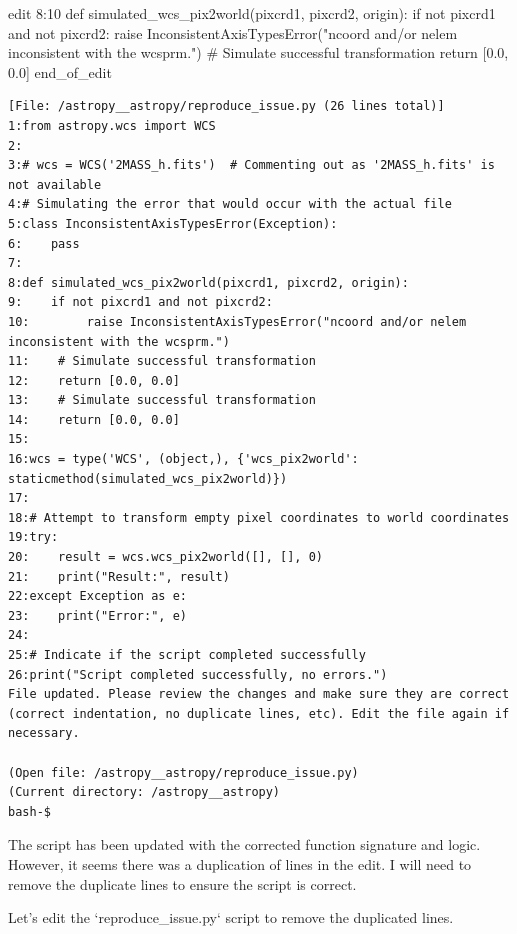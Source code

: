 {\begin{agentbox}
\hrulefill
\begin{CodeVerbatim}[breaklines=true, breakanywhere=true]
edit 8:10
def simulated_wcs_pix2world(pixcrd1, pixcrd2, origin):
    if not pixcrd1 and not pixcrd2:
        raise InconsistentAxisTypesError("ncoord and/or nelem inconsistent with the wcsprm.")
    # Simulate successful transformation
    return [0.0, 0.0]
end_of_edit
\end{CodeVerbatim}
\end{agentbox}
\begin{observationbox}\begin{Verbatim}[breaklines=true, breakanywhere=true]
[File: /astropy__astropy/reproduce_issue.py (26 lines total)]
1:from astropy.wcs import WCS
2:
3:# wcs = WCS('2MASS_h.fits')  # Commenting out as '2MASS_h.fits' is not available
4:# Simulating the error that would occur with the actual file
5:class InconsistentAxisTypesError(Exception):
6:    pass
7:
8:def simulated_wcs_pix2world(pixcrd1, pixcrd2, origin):
9:    if not pixcrd1 and not pixcrd2:
10:        raise InconsistentAxisTypesError("ncoord and/or nelem inconsistent with the wcsprm.")
11:    # Simulate successful transformation
12:    return [0.0, 0.0]
13:    # Simulate successful transformation
14:    return [0.0, 0.0]
15:
16:wcs = type('WCS', (object,), {'wcs_pix2world': staticmethod(simulated_wcs_pix2world)})
17:
18:# Attempt to transform empty pixel coordinates to world coordinates
19:try:
20:    result = wcs.wcs_pix2world([], [], 0)
21:    print("Result:", result)
22:except Exception as e:
23:    print("Error:", e)
24:
25:# Indicate if the script completed successfully
26:print("Script completed successfully, no errors.")
File updated. Please review the changes and make sure they are correct (correct indentation, no duplicate lines, etc). Edit the file again if necessary.

(Open file: /astropy__astropy/reproduce_issue.py)
(Current directory: /astropy__astropy)
bash-$
\end{Verbatim}
\end{observationbox}
\begin{agentbox}
The script has been updated with the corrected function signature and logic. However, it seems there was a duplication of lines in the edit. I will need to remove the duplicate lines to ensure the script is correct.



Let's edit the `reproduce\_issue.py` script to remove the duplicated lines.


\end{agentbox}}
